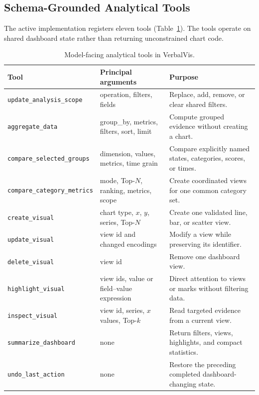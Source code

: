 \documentclass[journal]{IEEEtran}
\begin{document}
\subsection{Schema-Grounded Analytical Tools}
\label{sec:system-tools}

The active implementation registers eleven tools (Table~\ref{tab:tools}). The tools operate on shared dashboard state rather than returning unconstrained chart code.

\begin{table}[t]
\centering
\caption{Model-facing analytical tools in VerbalVis.}
\label{tab:tools}
\small
\begin{tabularx}{\textwidth}{p{}p{}X}
\toprule
\textbf{Tool} & \textbf{Principal arguments} & \textbf{Purpose} \\
\midrule
\texttt{update\_analysis\_scope} & operation, filters, fields & Replace, add, remove, or clear shared filters. \\
\texttt{aggregate\_data} & group\_by, metrics, filters, sort, limit & Compute grouped evidence without creating a chart. \\
\texttt{compare\_selected\_groups} & dimension, values, metrics, time grain & Compare explicitly named states, categories, scores, or times. \\
\texttt{compare\_category\_metrics} & mode, Top-$N$, ranking, metrics, scope & Create coordinated views for one common category set. \\
\texttt{create\_visual} & chart type, $x$, $y$, series, Top-$N$ & Create one validated line, bar, or scatter view. \\
\texttt{update\_visual} & view id and changed encodings & Modify a view while preserving its identifier. \\
\texttt{delete\_visual} & view id & Remove one dashboard view. \\
\texttt{highlight\_visual} & view ids, value or field--value expression & Direct attention to views or marks without filtering data. \\
\texttt{inspect\_visual} & view id, series, $x$ values, Top-$k$ & Read targeted evidence from a current view. \\
\texttt{summarize\_dashboard} & none & Return filters, views, highlights, and compact statistics. \\
\texttt{undo\_last\_action} & none & Restore the preceding completed dashboard-changing state. \\
\bottomrule
\end{tabularx}
\end{table}
\end{document}
